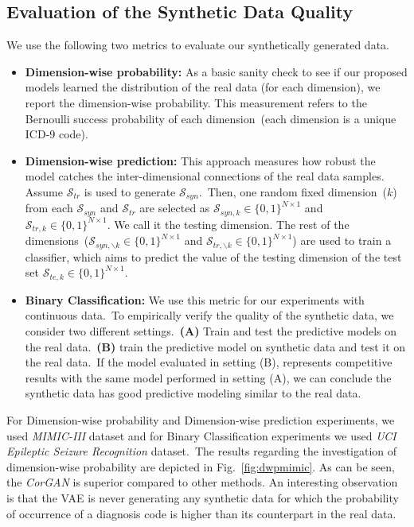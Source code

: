 \documentclass[letterpaper]{article} \usepackage{aaai20}  \usepackage{times}  \usepackage{helvet} \usepackage{courier}  \usepackage[hyphens]{url}  \usepackage{graphicx} \urlstyle{rm} \def\UrlFont{\rm}  \usepackage{graphicx}  \frenchspacing  \setlength{\pdfpagewidth}{8.5in}  \setlength{\pdfpageheight}{11in}
\begin{document}
\subsection{Evaluation of the Synthetic Data Quality}\label{sec:Experimentssub:realistic}

We use the following two metrics to evaluate our synthetically generated data.

\begin{itemize}
    \item  \textbf{Dimension-wise probability:} As a basic sanity check to see if our proposed models learned the distribution of the real data (for each dimension), we report the dimension-wise probability. This measurement refers to the Bernoulli success probability of each dimension~(each dimension is a unique ICD-9 code).
    
    \item  \textbf{Dimension-wise prediction:} This approach measures how robust the model catches the inter-dimensional connections of the real data samples. Assume $\mathcal{S}_{tr}$ is used to generate $\mathcal{S}_{syn}$.~Then, one random fixed dimension~($k$) from each $\mathcal{S}_{syn}$ and $\mathcal{S}_{tr}$ are selected as $\mathcal{S}_{syn,k} \in \{0,1\}^{N \times 1}$ and $\mathcal{S}_{tr,k} \in \{0,1\}^{N \times 1}$. We call it the testing dimension. The rest of the dimensions~($\mathcal{S}_{syn, \backslash k} \in \{0,1\}^{N \times 1}$ and $\mathcal{S}_{tr, \backslash k} \in \{0,1\}^{N \times 1}$) are used to train a classifier, which aims to predict the value of the testing dimension of the test set $\mathcal{S}_{te,k} \in \{0,1\}^{N \times 1}$.
    
    \item  \textbf{Binary Classification:} We use this metric for our experiments with continuous data.~To empirically verify the quality of the synthetic data, we consider two different settings.~\textbf{(A)} Train and test the predictive models on the real data.~\textbf{(B)} train the predictive model on synthetic data and test it on the real data.~If the model evaluated in setting (B), represents competitive results with the same model performed in setting (A), we can conclude the synthetic data has good predictive modeling similar to the real data.
\end{itemize}{}

For Dimension-wise probability and Dimension-wise prediction experiments, we used \textit{MIMIC-III} dataset and for Binary Classification experiments we used \textit{UCI Epileptic Seizure Recognition} dataset.~The results regarding the investigation of dimension-wise probability are depicted in Fig.~\ref{fig:dwpmimic}. As can be seen, the \textit{CorGAN} is superior compared to other methods. An interesting observation is that the VAE is never generating any synthetic data for which the probability of occurrence of a diagnosis code is higher than its counterpart in the real data.
\end{document}
